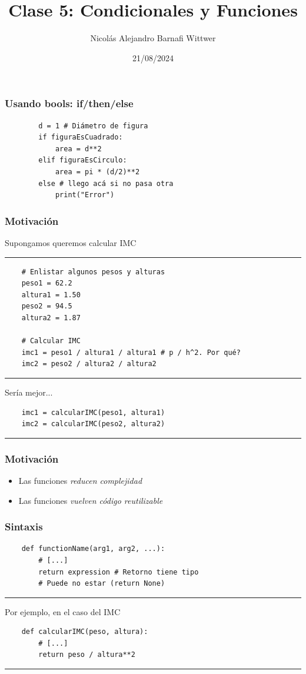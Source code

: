 \documentclass[14pt,aspectratio=169,xcolor=dvipsnames]{beamer}
\title[short title]{Clase 5: Condicionales y Funciones}
\subtitle{}
\author[NA Barnafi] {Nicolás Alejandro Barnafi Wittwer}
\institute[UC|CMM] 
{
    Pontificia Universidad Católica de Chile \\
    Centro de Modelamiento Matemático
}
\date{21/08/2024}
\begin{document}
\begin{frame}
    \maketitle
\end{frame}
\begin{frame}[fragile]\frametitle{Usando bools: if/then/else}

    \begin{verbatim}
        d = 1 # Diámetro de figura
        if figuraEsCuadrado:
            area = d**2
        elif figuraEsCirculo:
            area = pi * (d/2)**2
        else # llego acá si no pasa otra
            print("Error")
    \end{verbatim}    
\end{frame}
\begin{frame}[fragile]\frametitle{Motivación}
Supongamos queremos calcular IMC

\rule{\textwidth}{1pt}
\scriptsize
\begin{verbatim}
    # Enlistar algunos pesos y alturas
    peso1 = 62.2
    altura1 = 1.50
    peso2 = 94.5
    altura2 = 1.87
    
    # Calcular IMC
    imc1 = peso1 / altura1 / altura1 # p / h^2. Por qué?
    imc2 = peso2 / altura2 / altura2
\end{verbatim}
\rule{\textwidth}{1pt}
\pause Sería mejor... 
\begin{verbatim}
    imc1 = calcularIMC(peso1, altura1)
    imc2 = calcularIMC(peso2, altura2)
\end{verbatim}
\rule{\textwidth}{1pt}

\end{frame}
\begin{frame}\frametitle{Motivación}
    \begin{itemize}
        \item Las funciones \emph{reducen complejidad}
        \item Las funciones \emph{vuelven código reutilizable}
    \end{itemize}
\end{frame}
\begin{frame}[fragile]\frametitle{Sintaxis}

\begin{verbatim}
    def functionName(arg1, arg2, ...):
        # [...]
        return expression # Retorno tiene tipo 
        # Puede no estar (return None)
\end{verbatim}
\rule{\textwidth}{1pt}
Por ejemplo, en el caso del IMC
\begin{verbatim}
    def calcularIMC(peso, altura):
        # [...]
        return peso / altura**2
\end{verbatim}
\rule{\textwidth}{1pt}
\end{frame}
\end{document}
